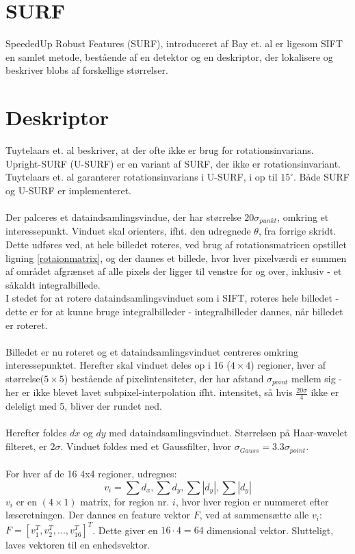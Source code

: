 \section{SURF}
SpeededUp Robust Features (SURF), introduceret af Bay et. al \cite{SURF} er ligesom SIFT en samlet metode, bestående af en detektor og en deskriptor, der lokalisere og beskriver blobs af forskellige størrelser.



\section{Deskriptor}
Tuytelaars et. al \cite{SURF} beskriver, at der ofte ikke er brug for rotationsinvarians. Upright-SURF (U-SURF) er en variant af SURF, der ikke er rotationsinvariant. Tuytelaars et. al garanterer rotationsinvarians i U-SURF, i op til $15^{\circ}$. Både SURF og U-SURF er implementeret.
\\
\\
Der palceres et dataindsamlingsvindue, der har størrelse $20 \sigma_{punkt}$, omkring et interessepunkt. Vinduet skal orienters, ifht. den udregnede $\theta$, fra forrige skridt. Dette udføres ved, at hele billedet roteres, ved brug af rotationsmatricen opstillet ligning \eqref{rotaionmatrix}, og der dannes et billede, hvor hver pixelværdi er summen af området afgrænset af alle pixels der ligger til venstre for og over, inklusiv - et såkaldt integralbillede. 
\\
I stedet for at rotere dataindsamlingsvinduet som i SIFT, roteres hele billedet - dette er for at kunne bruge integralbilleder - integralbilleder dannes, når billedet er roteret.
\\
\\
Billedet er nu roteret og et dataindsamlingsvinduet centreres omkring interessepunktet. Herefter skal vinduet deles op i 16 ($4 \times 4$) regioner, hver af størrelse($5\times 5$) bestående af pixelintensiteter, der har afstand $\sigma_{point}$ mellem sig - her er ikke blevet lavet subpixel-interpolation ifht. intensitet, så hvis $\frac{20\sigma}{4}$ ikke er deleligt med 5, bliver der rundet ned.
\\
\\
Herefter foldes $dx$ og $dy$ med dataindsamlingsvinduet. Størrelsen på Haar-wavelet filteret, er $2\sigma$. Vinduet foldes med et Gaussfilter, hvor $\sigma_{Gauss} = 3.3\sigma_{point}$.
\\
\\
For hver af de 16 4x4 regioner, udregnes: 
\begin{equation}
v_i = \sum d_x, \sum d_y, \sum |d_y|, \sum |d_y|
\label{surffeature}
\end{equation}
$v_i$ er en $(4\times 1)$ matrix, for region nr. $i$, hvor hver region er nummeret efter læseretningen. Der dannes en feature vektor $F$, ved at sammensætte alle $v_i$: $F = [v_1^T, v_2^T,..., v_{16}^T]^T$. Dette giver en $16 \cdot 4 = 64$ dimensional vektor. Slutteligt, laves vektoren til en enhedsvektor.
